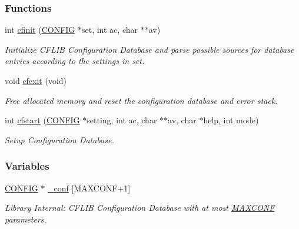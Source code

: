\subsubsection*{Functions}
\begin{CompactItemize}
\item 
int \hyperlink{group__cflib__core_ge593ff607f853bd5fc16a16bb6759314}{cfinit} (\hyperlink{struct_c_o_n_f_i_g}{CONFIG} $\ast$set, int ac, char $\ast$$\ast$av)
\begin{CompactList}\small\item\em Initialize CFLIB Configuration Database and parse possible sources for database entries according to the settings in {\em set\/}. \item\end{CompactList}\item 
void \hyperlink{group__cflib__core_g47bfff42f432b3e8b5b9f12b695e60db}{cfexit} (void)
\begin{CompactList}\small\item\em Free allocated memory and reset the configuration database and error stack. \item\end{CompactList}\item 
int \hyperlink{group__cflib__core_gdcf24d678203bd09a0a3e05b8a986c65}{cfstart} (\hyperlink{struct_c_o_n_f_i_g}{CONFIG} $\ast$setting, int ac, char $\ast$$\ast$av, char $\ast$help, int mode)
\begin{CompactList}\small\item\em Setup Configuration Database. \item\end{CompactList}\end{CompactItemize}
\subsubsection*{Variables}
\begin{CompactItemize}
\item 
\hypertarget{group__cflib__core_g7d0fec33ada97c2d7ef78e6c3d83da97}{
\hyperlink{struct_c_o_n_f_i_g}{CONFIG} $\ast$ \hyperlink{group__cflib__core_g7d0fec33ada97c2d7ef78e6c3d83da97}{\_\-conf} \mbox{[}MAXCONF+1\mbox{]}}
\label{group__cflib__core_g7d0fec33ada97c2d7ef78e6c3d83da97}

\begin{CompactList}\small\item\em Library Internal: CFLIB Configuration Database with at most \hyperlink{group__cflib__core_g1662beae23df229341c28d286379e2ad}{MAXCONF} parameters. \item\end{CompactList}\end{CompactItemize}


